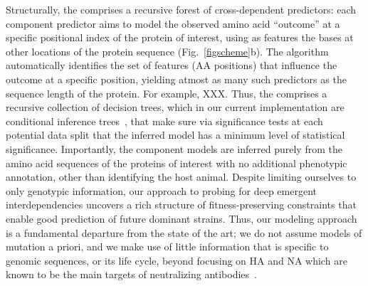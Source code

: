 \documentclass[onecolumn, compsoc,10pt]{IEEEtran}
\begin{document}
Structurally, the \enet comprises a recursive forest of  cross-dependent predictors: each component predictor aims to model the observed amino acid ``outcome'' at a specific positional index of the protein of interest, using as features   the bases  at other  locations of the protein sequence (Fig.~\ref{figscheme}b). The algorithm automatically identifies the set of features (AA positions) that influence the outcome at a specific position, yielding atmost as many such predictors as the sequence length of the protein.  For example, XXX. Thus, the \enet comprises a  recursive collection of decision trees, which in our current implementation are  conditional inference trees~\cite{Hothorn06unbiasedrecursive}, that make sure via significance tests at each potential data split that the inferred model has a minimum level of statistical significance.  %
Importantly, the \enet component models are inferred purely from the amino acid sequences of the proteins of interest with no additional phenotypic annotation, other than identifying the host animal. Despite limiting ourselves to only genotypic information, our approach to probing for deep emergent interdependencies   uncovers a rich structure of fitness-preserving constraints that enable good prediction of future dominant strains. Thus, our modeling approach is a fundamental departure from the state of the art; we do not assume models of mutation a priori, and we make use of little information that is specific to \infl genomic sequences, or its life cycle, beyond focusing on HA and NA which are known to be the main targets of neutralizing antibodies~\cite{shao2017evolution}.


\end{document}
